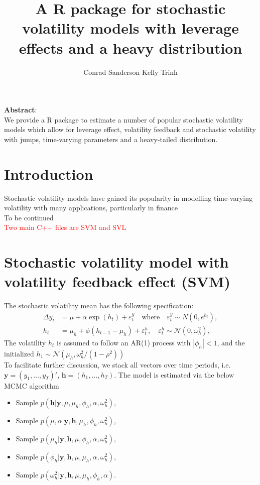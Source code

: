 \documentclass[11pt]{article}
\title{	\bfseries {A R package for stochastic volatility models with leverage effects and a heavy distribution }}
\author{Conrad Sanderson \; Kelly Trinh}
\numberwithin{equation}{section}
\begin{document}
    
\maketitle  
\noindent\makebox[\linewidth]{\rule{\textwidth}{1pt}} 
\textbf{Abstract}:\\
We provide a R package to estimate a number of popular stochastic volatility models which  allow for leverage effect, volatility feedback and stochastic volatility with jumps, time-varying parameters and a heavy-tailed distribution. \\
\noindent\makebox[\linewidth]{\rule{\textwidth}{1pt}}     
\section{Introduction}
Stochastic volatility models have gained its popularity in modelling time-varying volatility with many applications, particularly in finance\\
To be continued \\

\textcolor{red}{Two main C++ files are SVM and SVL}
\section{Stochastic volatility model with volatility feedback effect (SVM)}
The stochastic volatility mean has the following specification:
\begin{align}
\Delta y_t&=\mu+\alpha \exp({h_t}) +\varepsilon^y_t \quad \text{where}\quad \varepsilon^y_t \sim N(0, e^{h_t}), \label{eq:SVM1}\\
h_t &= \mu_h + \phi(h_{t-1} - \mu_h) + \varepsilon_t^h, \quad \varepsilon_t^h \sim \mathcal{N}(0, \omega_h^2), \label{eq:SVM2}
\end{align}
The volatility $h_t$ is assumed to follow an AR(1) process with $|\phi_h|<1$, and the initialized $h_1 \sim \mathcal{N}(\mu_h, \omega_h^2/(1 - \rho^2) )$ \\

To facilitate further discussion, we stack all vectors over time periods, i.e. $\mathbf{y}=(y_1,\ldots, y_T)'$, $\mathbf{h}=(h_1,\ldots, h_{T})$.
The model is estimated via the below MCMC algorithm  

\begin{itemize}
\item Sample $p(\mathbf{h}|\mathbf{y}, \mu, \mu_h, \phi_h, \alpha, \omega^2_h)$,
\item Sample $p(\mu, \alpha |\mathbf{y}, \mathbf{h}, \mu_h, \phi_h, \omega^2_h)$,
\item Sample $p(\mu_h|\mathbf{y}, \mathbf{h}, \mu, \phi_h, \alpha, \omega^2_h),$
\item Sample $p(\phi_h|\mathbf{y}, \mathbf{h}, \mu, \mu_h, \alpha, \omega^2_h),$
\item Sample $p(\omega^2_h|\mathbf{y}, \mathbf{h}, \mu, \mu_h, \phi_h, \alpha).$
\end{itemize}
\end{document}
